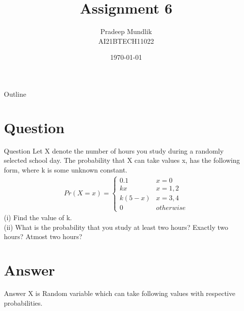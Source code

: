 \documentclass{beamer}
\title{Assignment 6}%
\author{Pradeep Mundlik \\ AI21BTECH11022}
\date{\today}
\begin{document}
\begin{frame}
    \titlepage 
\end{frame}



\begin{frame}{Outline}
    \tableofcontents
\end{frame}


\section{Question}
\begin{frame}{Question}
    Let X denote the number of hours you study during a randomly selected
    school day. The probability that X can take values x, has the following form, where
    k is some unknown constant. \\
    \begin{align}
        Pr(X = x) = 
        \begin{cases}
            0.1 & x = 0 \\
            kx & x = 1,2 \\
            k\left(5-x\right) & x = 3,4 \\
            0 & otherwise
        \end{cases}
    \end{align}
    (i) Find the value of k.\\
    (ii) What is the probability that you study at least two hours? Exactly two hours?
    Atmost two hours? 
\end{frame}

\section{Answer}
\begin{frame}{Answer}
    X is Random variable which can take following values with respective probabilities. 
    \begin{table}[htb]
        \tiny
        \caption{}
        \end{table}
    \end{frame}
    
\end{document}
